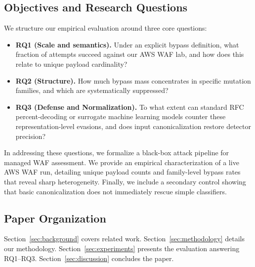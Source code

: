 \subsection{Objectives and Research Questions}
We structure our empirical evaluation around three core questions:
\begin{itemize}
  \item \textbf{RQ1 (Scale and semantics).} Under an explicit bypass definition, what fraction of attempts succeed against our AWS WAF lab, and how does this relate to unique payload cardinality?
  \item \textbf{RQ2 (Structure).} How much bypass mass concentrates in specific mutation families, and which are systematically suppressed?
  \item \textbf{RQ3 (Defense and Normalization).} To what extent can standard RFC percent-decoding or surrogate machine learning models counter these representation-level evasions, and does input canonicalization restore detector precision?
\end{itemize}


In addressing these questions, we formalize a black-box attack pipeline for managed WAF assessment. We provide an empirical characterization of a live AWS WAF run, detailing unique payload counts and family-level bypass rates that reveal sharp heterogeneity. Finally, we include a secondary control showing that basic canonicalization does not immediately rescue simple classifiers.

\subsection{Paper Organization}
Section~\ref{sec:background} covers related work. Section~\ref{sec:methodology} details our methodology. Section~\ref{sec:experiments} presents the evaluation answering RQ1--RQ3. Section~\ref{sec:discussion} concludes the paper.
